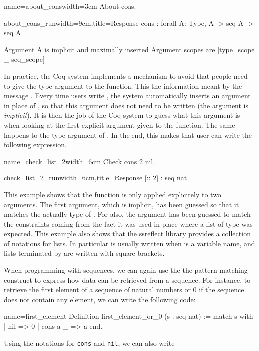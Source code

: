 \begin{coq}{name=about_cons}{width=3cm}
About cons.
$~$
$~$
$~$
\end{coq}
\begin{coqout}{about_cons_run}{width=9cm,title=Response}
cons : forall A: Type, A -> seq A -> seq A

Argument A is implicit and maximally inserted
Argument scopes are [type_scope _ seq_scope]
\end{coqout}
In practice, the Coq system implements a mechanism to avoid that
people need to give the type argument to the  function.  This
the information meant by the message .  Every time users write , the system automatically
inserts an argument in place of , so that this argument does not
need to be written (the argument is {\em implicit}).  It is then the
job of the Coq system to guess what this argument is when looking at
the first explicit argument given to the function.  The same happens
to the type argument of .  In the end, this makes that user can
write the following expression.

\begin{coq}{name=check_list_2}{width=6cm}
Check cons 2 nil.
\end{coq}
\begin{coqout}{check_list_2_run}{width=6cm,title=Response}
[:: 2] : seq nat
\end{coqout}
This example shows that the function  is only applied
explicitely to two arguments.  The first argument, which is implicit,
has been guessed so that it matches the actually type of .  For 
 also, the argument has been guessed to match the constraints
coming from the fact it was used in place where a list of type  was expected.  This example also shows that the ssreflect
library provides a collection of notations for lists.  In particular
 is usually written  when  is a variable
name, and lists terminated by  are written with square brackets.

When programming with sequences, we can again use the the pattern matching
construct to express how data can be retrieved from a sequence.  For
instance, to retrieve the first element of a sequence of natural numbers
or 0 if the sequence does not contain any element, we can write the
following code:

\begin{coq}{name=first_element}{}
Definition first_element_or_0 (s : seq nat) :=
  match s with
  | nil => 0
  | cons a _ => a
  end.
\end{coq}
Using the notations for {\tt cons} and {\tt nil}, we can also write

